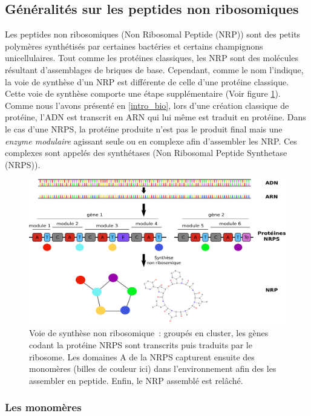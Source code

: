 \subsection{Généralités sur les peptides non ribosomiques}
Les peptides non ribosomiques (Non Ribosomal Peptide (NRP)) sont des petits polymères synthétisés par certaines bactéries et certains champignons unicellulaires.
Tout comme les protéines classiques, les NRP sont des molécules résultant d'assemblages de briques de base.
Cependant, comme le nom l'indique, la voie de synthèse d'un NRP est différente de celle d'une protéine classique.
Cette voie de synthèse comporte une étape supplémentaire (Voir figure \ref{global}).
Comme nous l'avons présenté en \ref{intro_bio}, lors d'une création classique de protéine, l'ADN est transcrit en ARN qui lui même est traduit en protéine.
Dans le cas d'une NRPS, la protéine produite n'est pas le produit final mais une \textit{enzyme modulaire} agissant seule ou en complexe afin d'assembler les NRP.
Ces complexes sont appelés des synthétases (Non Ribosomal Peptide Synthetase (NRPS)).

\begin{figure}[h!]
  \begin{center}
    \includegraphics[width=450px]{Figures/bio/Intro/synthese.png}
    \caption{\label{global}Voie de synthèse non ribosomique~:
    groupés en cluster, les gènes codant la protéine NRPS sont transcrits puis traduits par le ribosome.
    Les domaines A de la NRPS capturent ensuite des monomères (billes de couleur ici) dans l'environnement afin des les assembler en peptide.
    Enfin, le NRP assemblé est relâché.
    }
  \end{center}
\end{figure}

\subsubsection{Les monomères}

